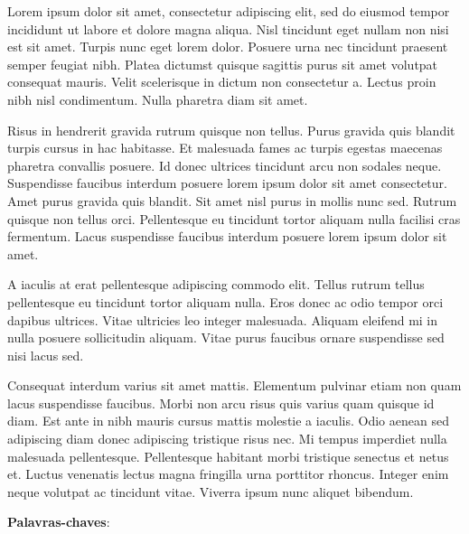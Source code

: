 
\setlength{\absparsep}{18pt} %
\begin{resumo}  
    

  Lorem ipsum dolor sit amet, consectetur adipiscing elit, sed do eiusmod tempor incididunt
  ut labore et dolore magna aliqua. Nisl tincidunt eget nullam non nisi est sit amet. Turpis
  nunc eget lorem dolor. Posuere urna nec tincidunt praesent semper feugiat nibh. Platea
  dictumst quisque sagittis purus sit amet volutpat consequat mauris. Velit scelerisque in
  dictum non consectetur a. Lectus proin nibh nisl condimentum. Nulla pharetra diam sit amet.
  
  Risus in hendrerit gravida rutrum quisque non tellus. Purus gravida quis blandit turpis cursus
  in hac habitasse. Et malesuada fames ac turpis egestas maecenas pharetra convallis posuere.
  Id donec ultrices tincidunt arcu non sodales neque. Suspendisse faucibus interdum posuere lorem
  ipsum dolor sit amet consectetur. Amet purus gravida quis blandit. Sit amet nisl purus in mollis
  nunc sed. Rutrum quisque non tellus orci. Pellentesque eu tincidunt tortor aliquam nulla
  facilisi cras fermentum. Lacus suspendisse faucibus interdum posuere lorem ipsum dolor sit amet.
  
  A iaculis at erat pellentesque adipiscing commodo elit. Tellus rutrum tellus pellentesque eu
  tincidunt tortor aliquam nulla. Eros donec ac odio tempor orci dapibus ultrices. Vitae ultricies
  leo integer malesuada. Aliquam eleifend mi in nulla posuere sollicitudin aliquam. Vitae purus
  faucibus ornare suspendisse sed nisi lacus sed.
  
  Consequat interdum varius sit amet mattis. Elementum pulvinar etiam non quam lacus suspendisse
  faucibus. Morbi non arcu risus quis varius quam quisque id diam. Est ante in nibh mauris cursus
  mattis molestie a iaculis. Odio aenean sed adipiscing diam donec adipiscing tristique risus nec.
  Mi tempus imperdiet nulla malesuada pellentesque. Pellentesque habitant morbi tristique senectus
  et netus et. Luctus venenatis lectus magna fringilla urna porttitor rhoncus. Integer enim neque
  volutpat ac tincidunt vitae. Viverra ipsum nunc aliquet bibendum.
    
  \noindent
  \textbf{Palavras-chaves}: \kwords
\end{resumo}
